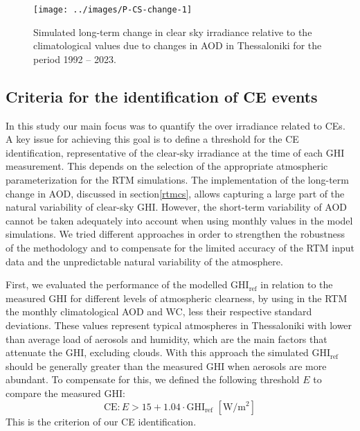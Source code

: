 \documentclass[preprint, 5p,
authoryear]{elsarticle} %
\begin{document}
\begin{figure}

{\centering \texttt{[image: ../images/P-CS-change-1]} 

}

\caption{Simulated long-term change in clear sky irradiance relative to the climatological values due to changes in AOD in Thessaloniki for the period 1992 -- 2023.}\label{fig:CS-change}
\end{figure}

\hypertarget{criteria-for-the-identification-of-ce-events}{%
\subsection{Criteria for the identification of CE
events}\label{criteria-for-the-identification-of-ce-events}}

In this study our main focus was to quantify the over irradiance related
to CEs. A key issue for achieving this goal is to define a threshold for
the CE identification, representative of the clear-sky irradiance at the
time of each GHI measurement. This depends on the selection of the
appropriate atmospheric parameterization for the RTM simulations. The
implementation of the long-term change in AOD, discussed in
section\nobreakspace{}\ref{rtmcs}, allows capturing a large part of the
natural variability of clear-sky GHI. However, the short-term
variability of AOD cannot be taken adequately into account when using
monthly values in the model simulations. We tried different approaches
in order to strengthen the robustness of the methodology and to
compensate for the limited accuracy of the RTM input data and the
unpredictable natural variability of the atmosphere.

First, we evaluated the performance of the modelled
\(\text{GHI}_\text{ref}\) in relation to the measured GHI for different
levels of atmospheric clearness, by using in the RTM the monthly
climatological AOD and WC, less their respective standard deviations.
These values represent typical atmospheres in Thessaloniki with lower
than average load of aerosols and humidity, which are the main factors
that attenuate the GHI, excluding clouds. With this approach the
simulated \(\text{GHI}_\text{ref}\) should be generally greater than the
measured GHI when aerosols are more abundant. To compensate for this, we
defined the following threshold \(E\) to compare the measured
\(\text{GHI}\): \begin{equation}
\text{CE} : E > 15 + 1.04 \cdot \text{GHI}_\text{ref} \,\,[\text{W}/\text{m}^2] \label{eq:CE4}
\end{equation} This is the criterion of our CE identification.
\end{document}
